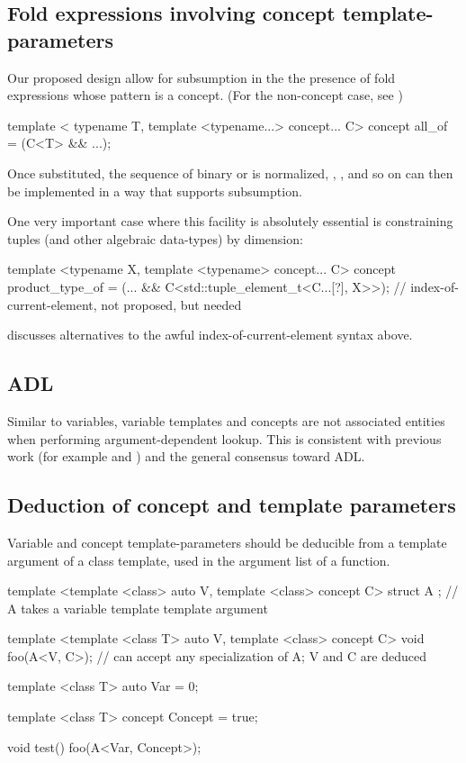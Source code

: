 \documentclass{wg21}
\begin{document}
\subsection{Fold expressions involving concept template-parameters}

Our proposed design allow for subsumption in the the presence of fold expressions whose pattern is a concept.
(For the non-concept case, see )


\begin{colorblock}
template <
    typename T,
    template <typename...> concept... C>
concept all_of = (C<T> && ...);
\end{colorblock}

Once substituted, the sequence of binary \tcode{\&\&} or \tcode{||} is normalized,
, , and so on can then be implemented in a way that supports subsumption.

One very important case where this facility is absolutely essential is constraining tuples (and other algebraic data-types) by dimension:

\begin{colorblock}
template <typename X, template <typename> concept... C>
concept product_type_of = (... && C<std::tuple_element_t<C...[?], X>>);
//   index-of-current-element, not proposed, but needed  ~~~~~~~
\end{colorblock}

 discusses alternatives to the awful index-of-current-element syntax above.

\subsection{ADL}

Similar to variables, variable templates and concepts are not associated entities when performing argument-dependent lookup.
This is consistent with previous work (for example  and ) and the general consensus toward ADL.

\subsection{Deduction of concept and template parameters}

Variable and concept template-parameters should be deducible from a template argument of a class template, used in the argument list of a function.

\begin{colorblock}
template <template <class> auto V, template <class> concept C>
struct A {}; // A takes a variable template template argument

template <template <class T> auto V, template <class> concept C>
void foo(A<V, C>);  // can accept any specialization of A; V and C are deduced

template <class T>
auto Var = 0;

template <class T>
concept Concept = true;

void test() {
    foo(A<Var, Concept>{});
}
\end{colorblock}
\end{document}
